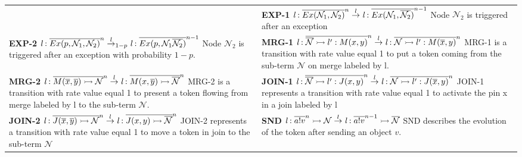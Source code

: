 \documentclass[3p,times,procedia,authoryear,round]{elsarticle}
\begin{document}
\begin{table}[ht]
\begin{center}
\begin{tabular}{ m{7cm} m{7cm} }
			&
		

			\textbf{EXP-1} $ \emph{l} :  \overline{Ex(\mathcal{N}_{1}, \mathcal{N}_{2} )}^{n} \stackrel{l}{\rightarrow} \emph{l} :  \overline{ Ex(\mathcal{N}_{1}, \overline{\mathcal{N}_{2}} )}^{n-1}$ Node $\mathcal{N}_{2}$ is triggered after an exception
            \\
			
			
			\textbf{EXP-2} $ \emph{l} :  \overline{Ex(p,\mathcal{N}_{1}, \mathcal{N}_{2} )}^{n} \stackrel{l}{\rightarrow}_{1-p}  \emph{l} :  \overline{ Ex(p,\mathcal{N}_{1} \overline{\mathcal{N}_{2}} )}^{n-1}$ Node $\mathcal{N}_{2}$ is triggered after an exception with probability $1-p$.
			
			&
			\textbf{MRG-1} $  \emph{l} : \overline{\overline{\mathcal{N}} \rightarrowtail l':M(x,y)}^{n}  \stackrel{l}{\rightarrow} \emph{l} : \overline{\mathcal{N} \rightarrowtail l':M(\overline{x},y)}^{n}$
			MRG-1 is a transition with  rate value equal 1 to put a token coming from the sub-term $\mathcal{N}$ on merge labeled by l.
			\\
			
			\textbf{MRG-2} $  \emph{l} : \overline{M(\overline{x},\overline{y}) \rightarrowtail \mathcal{N}}^{n}  \stackrel{l}{\rightarrow} \emph{l} : \overline{M(x,\overline{y}) \rightarrowtail \overline{\mathcal{N}}}^{n}  $
			MRG-2 is a transition with  rate value equal 1 to present a token flowing from  merge labeled by l to the sub-term $\mathcal{N}$.
			
			&
		

			\textbf{JOIN-1} $  \emph{l} : \overline{\overline{\mathcal{N}} \rightarrowtail l':J(x,y)}^{n}  \stackrel{l}{\rightarrow} \emph{l} : \overline{\mathcal{N} \rightarrowtail l':J(\overline{x},y)}^{n}$ JOIN-1 represents a transition with rate value equal 1 to activate the pin x in a 	join labeled by l
			\\
			
			\textbf{JOIN-2} $  \emph{l} : \overline{J(\overline{x},\overline{y}) \rightarrowtail \mathcal{N}}^{n}  \stackrel{l}{\rightarrow} \emph{l} : \overline{J(x,y) \rightarrowtail \overline{\mathcal{N}}}^{n}  $ JOIN-2 represents a transition with rate value equal 1 to move a token in join to the sub-term $\mathcal{N}$


			&
			\textbf{SND} $  \emph{l} : \overline{a!v}^{n} \rightarrowtail \mathcal{N} \stackrel{l}{\rightarrow} \emph{l} : \overline{a!v}^{n-1} \rightarrowtail \overline{\mathcal{N}} $ SND describes the evolution of the token after sending
			an object $v$.
			

\end{tabular}
\end{center}
\end{table}
\end{document}
